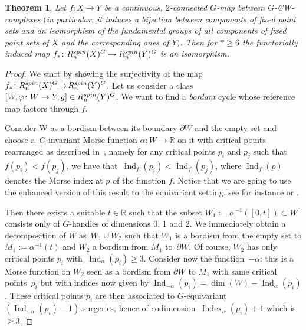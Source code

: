 \documentclass[11pt]{article}
\numberwithin{equation}{section}
\numberwithin{equation}{section}
\newtheorem{Theorem}{Theorem}[section]
\def\RR{\ensuremath{\mathbb{R}}}
\begin{document}
	\begin{Theorem}\label{G2conn}
		Let $f\colon X \rightarrow Y$ be a continuous, $2$-connected $G$-map
		between $G$-CW-complexes $($in particular, it induces a bijection
		between components of fixed point sets and an isomorphism of the
		fundamental groups of all
		components of fixed point sets of $X$ and the corresponding ones of
		$Y)$. Then for $*\ge 6$ the
		functorially induced map
$f_{*}\colon R_{n}^{\rm spin}(X)^{G} \rightarrow R_{n}^{\rm spin}(Y)^{G}
$
		is an isomorphism.
	\end{Theorem}
	\begin{proof}
\! We start by showing the surjectivity of the map
$f_{*}\colon R_{n}^{\rm spin}(X)^{G} \!\rightarrow\! R_{n}^{\rm spin}(Y)^{G}$.
		Let us consider a class $[W,\varphi\colon W \rightarrow Y, g] \in
		R_{n}^{\rm spin}(Y)^{G}$. We want to find a \textit{bordant} cycle whose reference map factors through $f$.
		
Consider W as a bordism between its boundary $\partial W$ and the empty set
		and choose a~$G$-invariant Morse function $\alpha\colon W\to \RR$ on it with
		critical points rearranged as described in~\cite[Theorem 4.8]{Milnor}, namely
		for any critical points $p_{i}$ and $p_{j}$ such that $f(p_{i}) < f(p_{j})$,
		we have that~${\operatorname{Ind}_f(p_{i}) < \operatorname{Ind}_f(p_{j})}$, where $\operatorname{Ind}_f(p)$ denotes the Morse index at $p$ of the function $f$. Notice that we are going to use the
		enhanced version of this result to the equivariant setting, see for instance
		\cite{Mayer} or \cite{Wasserman}.
		
		Then there exists a suitable $t\in \RR$ such that the subset $W_1:=\alpha^{-1}([0,t])\subset W$ consists only of $G$-handles of dimensions 0, 1 and 2. We immediately obtain a decomposition of $W$ as~${W_{1} \cup W_{2}}$ such that $W_{1}$ is a bordism from the empty set to $M_{1}:=\alpha^{-1}(t)$ and $W_{2}$ a bordism from $M_{1}$ to~$\partial W$.
		Of course, $W_{2}$ has only critical points $p_{i}$ with~$\operatorname{Ind}_{\alpha}(p_{i}) \geq 3$. Consider now the function~$-\alpha$: this is a Morse function on $W_{2}$ seen as a bordism from $\partial W$ to $M_{1}$ with same critical points~$p_{i}$ but with indices now given by $\operatorname{Ind}_{-\alpha}(p_{i})=\dim(W)-\operatorname{Ind}_{\alpha}(p_{i})$. These critical points $p_{i}$ are then associated to $G$-equivariant~${(\operatorname{Ind}_{-\alpha}(p_{i})-1)}$-surgeries, hence of codimension~${\operatorname{Index}_{\alpha}(p_{i})+1}$ which is $\geq 3$.
		

\end{proof}
\end{document}
